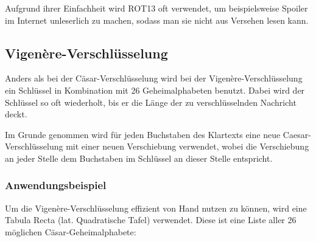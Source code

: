 Aufgrund ihrer Einfachheit wird ROT13 oft verwendet, um beispielsweise Spoiler im Internet unleserlich zu machen, sodass man sie nicht aus Versehen lesen kann.\cite{geowiki:rot13}


\newpage %
\subsection{Vigenère-Verschlüsselung}
\label{sec:vigenere}
Anders als bei der Cäsar-Verschlüsselung wird bei der Vigenère-Verschlüsselung ein Schlüssel in Kombination mit 26 Geheimalphabeten benutzt. Dabei wird der Schlüssel so oft wiederholt, bis er die Länge der zu verschlüsselnden Nachricht deckt. \cite{wikipedia:vigenere}

Im Grunde genommen wird für jeden Buchstaben des Klartexts eine neue Caesar-Verschlüsselung mit einer neuen Verschiebung verwendet, wobei die Verschiebung an jeder Stelle dem Buchstaben im Schlüssel an dieser Stelle entspricht.


\subsubsection{Anwendungsbeispiel}
\label{sec:v-anwendungsbeispiel}
Um die Vigenère-Verschlüsselung effizient von Hand nutzen zu können, wird eine Tabula Recta (lat. Quadratische Tafel) verwendet. Diese ist eine Liste aller 26 möglichen Cäsar-Geheimalphabete:

